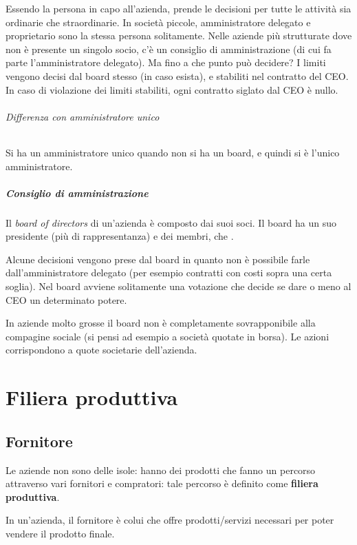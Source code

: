 Essendo la persona in capo all'azienda, prende le decisioni per tutte le
attività sia ordinarie che straordinarie. In società piccole,
amministratore delegato e proprietario sono la stessa persona solitamente. Nelle
aziende più strutturate dove non è presente un singolo socio, c'è un
consiglio di amministrazione (di cui fa parte l'amministratore delegato).
Ma fino a che punto può decidere? I limiti vengono decisi dal board stesso (in
caso esista), e stabiliti nel contratto del CEO. In caso di violazione dei
limiti stabiliti, ogni contratto siglato dal CEO è nullo.

\subparagraph*{Differenza con amministratore unico} Si ha un amministratore
unico quando non si ha un board, e quindi si è l'unico amministratore.

\paragraph*{Consiglio di amministrazione} Il \textit{board of directors} di
un'azienda è composto dai suoi soci. Il board ha un suo presidente (più di
rappresentanza) e dei membri, che .

Alcune decisioni vengono prese dal board in quanto non è possibile farle
dall'amministratore delegato (per esempio contratti con costi sopra una certa
soglia). Nel board avviene solitamente una votazione che decide se dare o meno
al CEO un determinato potere.

In aziende molto grosse il board non è completamente sovrapponibile alla
compagine sociale (si pensi ad esempio a società quotate in borsa). Le azioni
corrispondono a quote societarie dell'azienda.

\chapter{Filiera produttiva}

\section{Fornitore}

Le aziende non sono delle isole: hanno dei prodotti che fanno un percorso
attraverso vari fornitori e compratori: tale percorso è definito come
\textbf{filiera produttiva}.

\begin{definition}[Fornitore]
In un'azienda, il fornitore è colui che offre prodotti/servizi necessari per 
poter vendere il prodotto finale. 
\end{definition}

